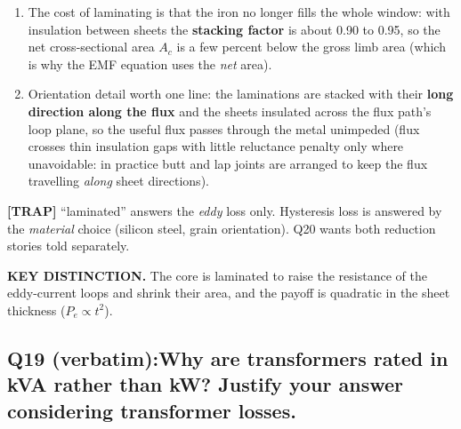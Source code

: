 \documentclass[11pt]{article}
\newcommand{\qhead}[2]{\subsection*{\color{copper}#1\quad\color{iron}#2}}
\newcommand{\keydist}[1]{\vspace{2pt}\textbf{\color{red}KEY DISTINCTION.} #1}
\newcommand{\trap}[1]{\vspace{2pt}\textbf{\color{red}[TRAP]} #1}
\begin{document}
\begin{enumerate}[label=\arabic*.]
\item The cost of laminating is that the iron no longer fills the whole window: with insulation between sheets the \textbf{stacking factor} is about 0.90 to 0.95, so the net cross-sectional area $A_c$ is a few percent below the gross limb area (which is why the EMF equation uses the \emph{net} area).
\item Orientation detail worth one line: the laminations are stacked with their \textbf{long direction along the flux} and the sheets insulated across the flux path's loop plane, so the useful flux passes through the metal unimpeded (flux crosses thin insulation gaps with little reluctance penalty only where unavoidable: in practice butt and lap joints are arranged to keep the flux travelling \emph{along} sheet directions).
\end{enumerate}

\trap{``laminated'' answers the \emph{eddy} loss only. Hysteresis loss is answered by the \emph{material} choice (silicon steel, grain orientation). Q20 wants both reduction stories told separately.}

\keydist{The core is laminated to raise the resistance of the eddy-current loops and shrink their area, and the payoff is quadratic in the sheet thickness ($P_e \propto t^{2}$).}

\qhead{Q19 (verbatim):}{Why are transformers rated in kVA rather than kW? Justify your answer considering transformer losses.}
\end{document}
